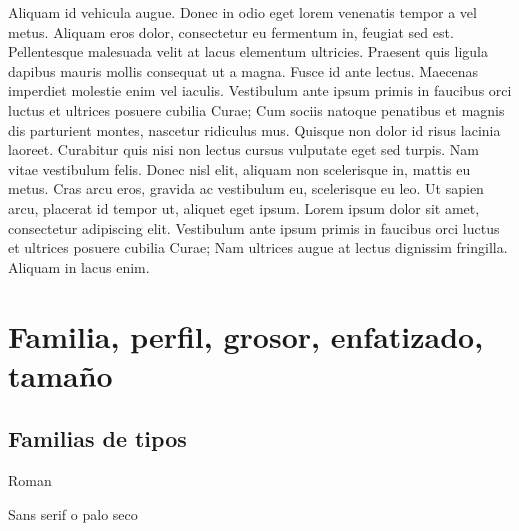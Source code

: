 \documentclass[11pt,a4paper]{article}
\begin{document}
Aliquam id vehicula augue. Donec in odio eget lorem venenatis tempor a vel metus. Aliquam eros dolor, consectetur eu fermentum in, feugiat sed est. Pellentesque malesuada velit at lacus elementum ultricies. Praesent quis ligula dapibus mauris mollis consequat ut a magna. Fusce id ante lectus. Maecenas imperdiet molestie enim vel iaculis. Vestibulum ante ipsum primis in faucibus orci luctus et ultrices posuere cubilia Curae; Cum sociis natoque penatibus et magnis dis parturient montes, nascetur ridiculus mus. Quisque non dolor id risus lacinia laoreet. Curabitur quis nisi non lectus cursus vulputate eget sed turpis. Nam vitae vestibulum felis. Donec nisl elit, aliquam non scelerisque in, mattis eu metus. Cras arcu eros, gravida ac vestibulum eu, scelerisque eu leo. Ut sapien arcu, placerat id tempor ut, aliquet eget ipsum. Lorem ipsum dolor sit amet, consectetur adipiscing elit. Vestibulum ante ipsum primis in faucibus orci luctus et ultrices posuere cubilia Curae; Nam ultrices augue at lectus dignissim fringilla. Aliquam in lacus enim.



 


\section{Familia, perfil, grosor, enfatizado, tamaño}





\subsection{Familias de tipos}


\textrm{Roman}

\textsf{Sans serif o palo seco}
\end{document}
